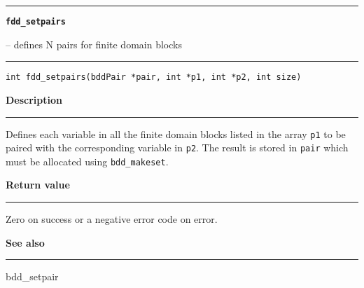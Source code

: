 \begin{minipage}{\textwidth}

\noindent\begin{minipage}{\textwidth}
\rule{\textwidth}{0.5mm}
{\tt\bf fdd\_setpairs }
\--- defines N pairs for finite domain blocks  \hspace{\fill}
\\\rule[1.5ex]{\textwidth}{0.5mm}
\end{minipage}

\noindent\begin{verbatim}
int fdd_setpairs(bddPair *pair, int *p1, int *p2, int size) 
\end{verbatim}

\vspace{\parsep}\noindent
{\bf Description}\\\rule[1.5ex]{\textwidth}{0.2mm}\vspace{-1.5ex}\setlength{\parindent}{1em}
Defines each variable in all the finite domain blocks listed in
           the array {\tt p1} to be paired with the corresponding variable
	   in {\tt p2}. The result
	   is stored in {\tt pair} which must be allocated using
	   {\tt bdd\_makeset}.

\setlength{\parindent}{0em}\vspace{\parsep}\vspace{\baselineskip}\noindent
{\bf Return value}\\\rule[1.5ex]{\textwidth}{0.2mm}\vspace{-1.5ex}
Zero on success or a negative error code on error. 

\vspace{\parsep}\vspace{\baselineskip}\noindent
{\bf See also}\\\rule[1.5ex]{\textwidth}{0.2mm}\vspace{-1.5ex}
bdd\_setpair 
\end{minipage}
\vspace{8ex}
